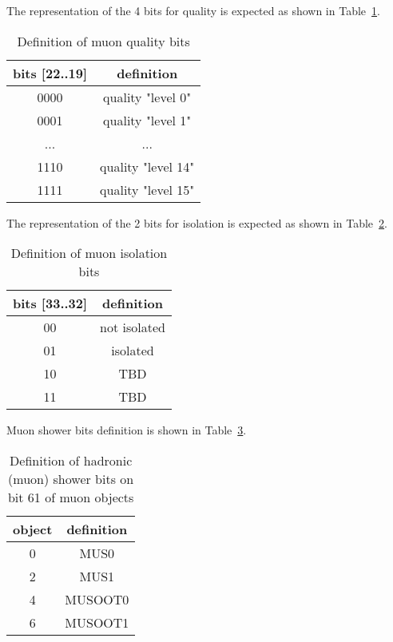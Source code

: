 The representation of the 4 bits for quality is expected as shown in Table~\ref{tab:gtl:muon_quality_bits}.\\

\begin{table}[ht]
\caption{Definition of muon quality bits}
\vspace{5mm}
\centering
\begin{tabular}{|c|c|}\hline
bits [22..19] & definition \\\hline\hline
0000 & quality "level 0" \\
0001 & quality "level 1" \\
... & ... \\
1110 & quality "level 14" \\
1111 & quality "level 15" \\\hline
\end{tabular}
\label{tab:gtl:muon_quality_bits}
\end{table}

The representation of the 2 bits for isolation is expected as shown in Table~\ref{tab:gtl:muon_iso_bits}.\\

\begin{table}[ht]
\caption{Definition of muon isolation bits}
\vspace{5mm}
\centering
\begin{tabular}{|c|c|}\hline
bits [33..32] & definition \\\hline\hline
00 & not isolated \\
01 & isolated \\
10 & TBD \\
11 & TBD \\\hline
\end{tabular}
\label{tab:gtl:muon_iso_bits}
\end{table}

Muon shower bits definition is shown in Table~\ref{tab:gtl:tab_muon_shower_bits}.\\

\begin{table}[ht]
\caption{Definition of hadronic (muon) shower bits on bit 61 of muon objects}
\vspace{5mm}
\centering
\begin{tabular}{|c|c|}\hline
object & definition \\\hline\hline
0 & MUS0 \\
2 & MUS1 \\
4 & MUSOOT0 \\
6 & MUSOOT1 \\\hline
\end{tabular}
\label{tab:gtl:tab_muon_shower_bits}
\end{table}


